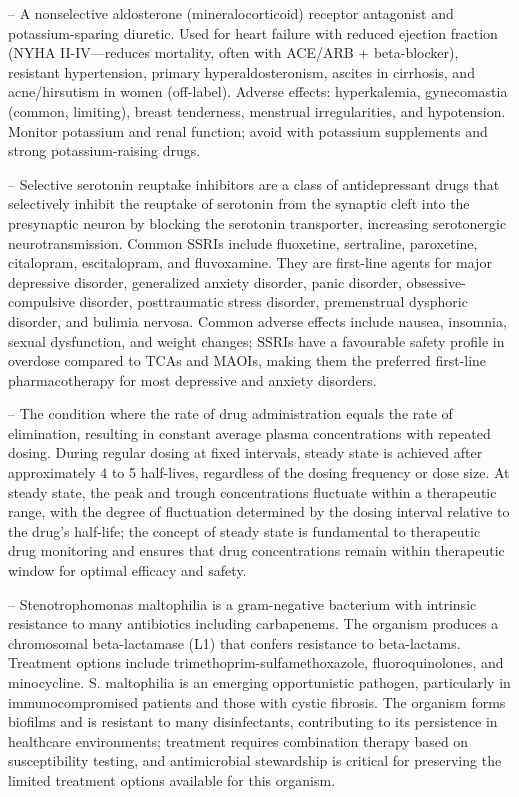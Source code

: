 -- A nonselective aldosterone (mineralocorticoid) receptor antagonist and potassium-sparing diuretic. Used for heart failure with reduced ejection fraction (NYHA II-IV—reduces mortality, often with ACE/ARB + beta-blocker), resistant hypertension, primary hyperaldosteronism, ascites in cirrhosis, and acne/hirsutism in women (off-label). Adverse effects: hyperkalemia, gynecomastia (common, limiting), breast tenderness, menstrual irregularities, and hypotension. Monitor potassium and renal function; avoid with potassium supplements and strong potassium-raising drugs.

-- Selective serotonin reuptake inhibitors are a class of antidepressant drugs that selectively inhibit the reuptake of serotonin from the synaptic cleft into the presynaptic neuron by blocking the serotonin transporter, increasing serotonergic neurotransmission. Common SSRIs include fluoxetine, sertraline, paroxetine, citalopram, escitalopram, and fluvoxamine. They are first-line agents for major depressive disorder, generalized anxiety disorder, panic disorder, obsessive-compulsive disorder, posttraumatic stress disorder, premenstrual dysphoric disorder, and bulimia nervosa. Common adverse effects include nausea, insomnia, sexual dysfunction, and weight changes; SSRIs have a favourable safety profile in overdose compared to TCAs and MAOIs, making them the preferred first-line pharmacotherapy for most depressive and anxiety disorders.

-- The condition where the rate of drug administration equals the rate of elimination, resulting in constant average plasma concentrations with repeated dosing. During regular dosing at fixed intervals, steady state is achieved after approximately 4 to 5 half-lives, regardless of the dosing frequency or dose size. At steady state, the peak and trough concentrations fluctuate within a therapeutic range, with the degree of fluctuation determined by the dosing interval relative to the drug's half-life; the concept of steady state is fundamental to therapeutic drug monitoring and ensures that drug concentrations remain within therapeutic window for optimal efficacy and safety.

-- Stenotrophomonas maltophilia is a gram-negative bacterium with intrinsic resistance to many antibiotics including carbapenems. The organism produces a chromosomal beta-lactamase (L1) that confers resistance to beta-lactams. Treatment options include trimethoprim-sulfamethoxazole, fluoroquinolones, and minocycline. S. maltophilia is an emerging opportunistic pathogen, particularly in immunocompromised patients and those with cystic fibrosis. The organism forms biofilms and is resistant to many disinfectants, contributing to its persistence in healthcare environments; treatment requires combination therapy based on susceptibility testing, and antimicrobial stewardship is critical for preserving the limited treatment options available for this organism.

